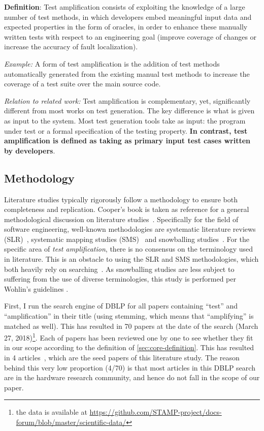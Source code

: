\begin{mdframed}
	\textbf{Definition}: Test amplification consists of exploiting the knowledge of a large number of test methods, in which developers embed meaningful input data and expected properties in the form of oracles, in order to enhance these manually written tests with respect to an engineering goal (\eg improve coverage of changes or increase the accuracy of fault localization).
\end{mdframed}

\emph{Example:} 
A form of test amplification is the addition of test methods automatically generated from the existing manual test methods to increase the coverage of a test suite over the main source code.

\emph{Relation to related work:} 
Test amplification is complementary, yet, significantly different from most works on test generation.
The key difference is what is given as input to the system.
Most test generation tools take as input:
the program under test or a formal specification of the testing property.
\textbf{In contrast, test amplification is defined as taking as primary input test cases written by developers}. 


\subsection{Methodology}
\label{subsec:sota:method:methodology}

Literature studies typically rigorously follow a methodology to ensure both completeness and replication. 
Cooper's book is taken as reference for a general methodological discussion on literature studies~\cite{cooper1998synthesizing}. 
Specifically for the field of software engineering, well-known methodologies are systematic literature reviews (SLR)~\cite{kitchenham2004procedures}, systematic mapping studies (SMS)~\cite{petersen2008systematic} and snowballing studies~\cite{wohlin2014guidelines}.
For the specific area of \emph{test amplification}, there is no consensus on the terminology used in literature. 
This is an obstacle to using the SLR and SMS methodologies, which both heavily rely on searching~\cite{Brereton2007}. 
As snowballing studies are less subject to suffering from the use of diverse terminologies, this study is performed per Wohlin's guidelines \cite{wohlin2014guidelines,jalali2012systematic}.

First, I run the search engine of DBLP for all papers containing ``test'' and ``amplification'' in their title (using stemming, which means that ``amplifying'' is matched as well).
This has resulted in 70 papers at the date of the search (March 27, 2018)\footnote{the data is available at \url{https://github.com/STAMP-project/docs-forum/blob/master/scientific-data/}}.
Each of papers has been reviewed one by one to see whether they fit in our scope according to the definition of \autoref{sec:core-definition}. 
This has resulted in 4 articles~\cite{HamletV93,zhang2012,leung12,Joshi07}, which are the seed papers of this literature study. 
The reason behind this very low proportion (4/70) is that most articles in this DBLP search are in the hardware research community, and hence do not fall in the scope of our paper.

